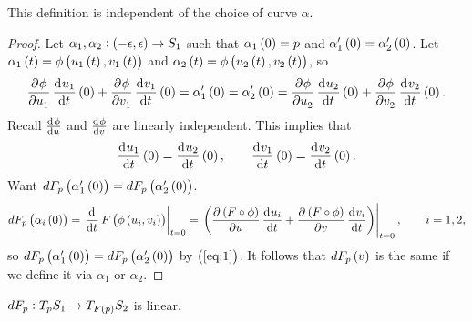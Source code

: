 \begin{proposition}
This definition is independent of the choice of curve $ \alpha $.
\end{proposition}

\begin{proof}
Let $ \alpha_1, \alpha_2 : \br{-\epsilon, \epsilon} \to S_1 $ such that $ \alpha_1\br{0} = p $ and $ \alpha_1'\br{0} = \alpha_2'\br{0} $. Let $ \alpha_1\br{t} = \phi\br{u_1\br{t}, v_1\br{t}} $ and $ \alpha_2\br{t} = \phi\br{u_2\br{t}, v_2\br{t}} $, so
$$ \dpd{\phi}{u_1}\dod{u_1}{t}\br{0} + \dpd{\phi}{v_1}\dod{v_1}{t}\br{0} = \alpha_1'\br{0} = \alpha_2'\br{0} = \dpd{\phi}{u_2}\dod{u_2}{t}\br{0} + \dpd{\phi}{v_2}\dod{v_2}{t}\br{0}. $$
Recall $ \tod{\phi}{u} $ and $ \tod{\phi}{v} $ are linearly independent. This implies that
\begin{equation}
\label{eq:1}
\dod{u_1}{t}\br{0} = \dod{u_2}{t}\br{0}, \qquad \dod{v_1}{t}\br{0} = \dod{v_2}{t}\br{0}.
\end{equation}
Want $ dF_p\br{\alpha_1'\br{0}} = dF_p\br{\alpha_2'\br{0}} $.
$$ dF_p\br{\alpha_i\br{0}} = \eval{\dod{}{t}F\br{\phi\br{u_i, v_i}}}_{t = 0} = \eval{\br{\dpd{\br{F \circ \phi}}{u}\dod{u_i}{t} + \dpd{\br{F \circ \phi}}{v}\dod{v_i}{t}}}_{t = 0}, \qquad i = 1, 2, $$
so $ dF_p\br{\alpha_1'\br{0}} = dF_p\br{\alpha_2'\br{0}} $ by $ \br{\ref{eq:1}} $. It follows that $ dF_p\br{v} $ is the same if we define it via $ \alpha_1 $ or $ \alpha_2 $.
\end{proof}

\begin{proposition}
$ dF_p : T_pS_1 \to T_{F\br{p}}S_2 $ is linear.
\end{proposition}

